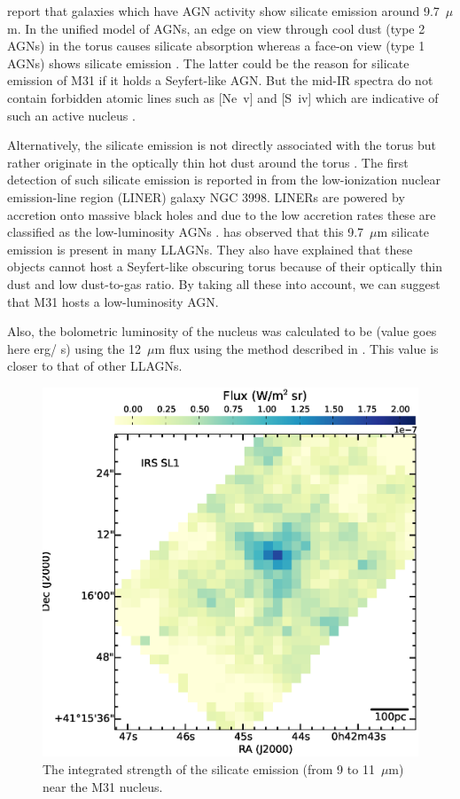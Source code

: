\citet{Spoon2007} report that galaxies which have AGN activity show silicate emission around 9.7~$\mu$m.
In the unified model of AGNs, an edge on view through cool dust (type 2 AGNs) in the torus causes silicate absorption whereas a face-on view (type 1 AGNs) 
shows silicate emission \citep{AGNtypes1995}. The latter could be the reason for silicate emission of M31 if it holds a Seyfert-like AGN. 
But the mid-IR spectra do not contain forbidden atomic lines such as [Ne~{\sc v}] and [S~{\sc iv}] which are indicative of such an active nucleus \citep{AGNref}.

 Alternatively, the silicate emission is not directly associated with the torus but rather originate in the optically thin hot dust around the torus \citep{Mason2012}. 
 The first detection of such silicate emission is reported in \citet{Sturm2005} from the low-ionization nuclear emission-line region (LINER) galaxy NGC 3998. 
 LINERs are powered by accretion onto massive black holes and due to the low accretion rates these are classified as the low-luminosity AGNs \citep{Kewley2006}. 
 \citealt{Mason2012} has observed that this 9.7~$\mu$m silicate emission is present in many LLAGNs. They also have explained that these objects cannot 
 host a Seyfert-like obscuring torus because of their optically thin dust and low dust-to-gas ratio. By taking all these into account, we can suggest that M31 
 hosts a low-luminosity AGN. 
 
Also, the bolometric luminosity of the nucleus was calculated to be (value goes here erg/ s) using the 12~$\mu$m flux using the method described in \citet{luminosity}. This value is closer to that of other LLAGNs.


\begin{figure}
\centering
\includegraphics[scale = 0.3]{./NUCsilicate.eps}
\caption{The integrated strength of the silicate emission (from 9 to 11~$\mu$m) near the M31 nucleus.}
\label{silicate}
\end{figure}
